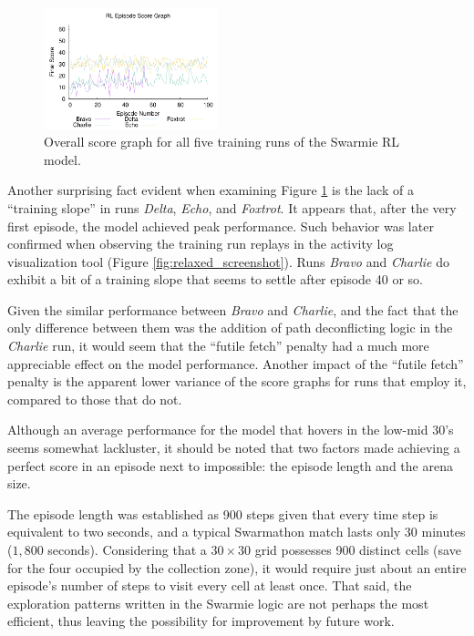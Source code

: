 \documentclass[sigconf,authordraft]{acmart}
\begin{document}
\begin{figure}[ht!]
  \centering
  \includegraphics[width=0.45\textwidth]{images/score_graph.pdf}
  \caption{Overall score graph for all five training runs of the Swarmie RL model.}
  \label{fig:score_graph}
\end{figure}

Another surprising fact evident when examining Figure \ref{fig:score_graph} is the lack of a ``training slope'' in runs \textit{Delta}, \textit{Echo}, and \textit{Foxtrot}. It appears that, after the very first episode, the model achieved peak performance. Such behavior was later confirmed when observing the training run replays in the activity log visualization tool (Figure \ref{fig:relaxed_screenshot}). Runs \textit{Bravo} and \textit{Charlie} do exhibit a bit of a training slope that seems to settle after episode 40 or so.

Given the similar performance between \textit{Bravo} and \textit{Charlie}, and the fact that the only difference between them was the addition of path deconflicting logic in the \textit{Charlie} run, it would seem that the ``futile fetch'' penalty had a much more appreciable effect on the model performance. Another impact of the ``futile fetch'' penalty is the apparent lower variance of the score graphs for runs that employ it, compared to those that do not.

Although an average performance for the model that hovers in the low-mid 30's seems somewhat lackluster, it should be noted that two factors made achieving a perfect score in an episode next to impossible: the episode length and the arena size.

The episode length was established as 900 steps given that every time step is equivalent to two seconds, and a typical Swarmathon match lasts only 30 minutes ($1,800$ seconds). Considering that a $30 \times 30$ grid possesses 900 distinct cells (save for the four occupied by the collection zone), it would require just about an entire episode's number of steps to visit every cell at least once. That said, the exploration patterns written in the Swarmie logic are not perhaps the most efficient, thus leaving the possibility for improvement by future work.
\end{document}

